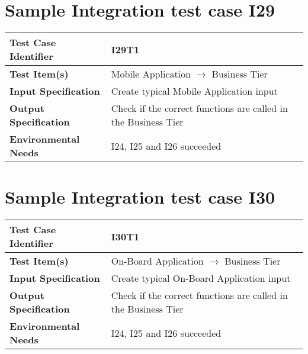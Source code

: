 \section{Sample Integration test case I29}\label{I29}
\begin{center}
	\vspace{0.6cm}
	\begin{tabular}{|l|l|}
		\hline
		\textbf{Test Case Identifier} & I29T1 \bigstrut \\\hline
		\textbf{Test Item(s)} & Mobile Application \ensuremath{\rightarrow} Business Tier \bigstrut \\\hline
		\textbf{Input Specification} & Create typical Mobile Application input \bigstrut \\\hline
		\textbf{Output Specification} & Check if the correct functions are called in the Business Tier \bigstrut \\\hline
		\textbf{Environmental Needs} & I24, I25 and I26 succeeded \bigstrut \\\hline
	\end{tabular}
\end{center}

\section{Sample Integration test case I30}\label{I30}
\begin{center}
	\vspace{0.6cm}
	\begin{tabular}{|l|l|}
		\hline
		\textbf{Test Case Identifier} & I30T1 \bigstrut \\\hline
		\textbf{Test Item(s)} & On-Board Application \ensuremath{\rightarrow} Business Tier \bigstrut \\\hline
		\textbf{Input Specification} & Create typical On-Board Application input \bigstrut \\\hline
		\textbf{Output Specification} & Check if the correct functions are called in the Business Tier \bigstrut \\\hline
		\textbf{Environmental Needs} & I24, I25 and I26 succeeded \bigstrut \\\hline
	\end{tabular}
\end{center}